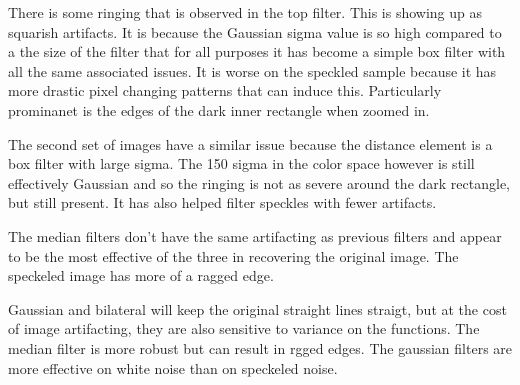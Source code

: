 \documentclass[12pt]{article}
\begin{document}
There is some ringing that is observed in the top filter. This is showing up as squarish artifacts. It is because the Gaussian sigma value is so high compared to a the size of the filter that for all purposes it has become a simple box filter with all the same associated issues. It is worse on the speckled sample because it has more drastic pixel changing patterns that can induce this. Particularly prominanet is the edges of the dark inner rectangle when zoomed in.

The second set of images have a similar issue because the distance element is a box filter with large sigma. The 150 sigma in the color space however is still effectively Gaussian and so the ringing is not as severe around the dark rectangle, but still present. It has also helped filter speckles with fewer artifacts.

The median filters don't have the same artifacting as previous filters and appear to be the most effective of the three in recovering the original image. The speckeled image has more of a ragged edge.

Gaussian and bilateral will keep the original straight lines straigt, but at the cost of image artifacting, they are also sensitive to variance on the functions. The median filter is more robust but can result in rgged edges. The gaussian filters are more effective on white noise than on speckeled noise.
\end{document}
